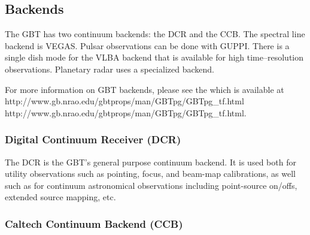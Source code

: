 

\subsection{Backends}\label{sec:backends}

The \gls{GBT} has two continuum backends: the \gls{DCR} and the \gls{CCB}.
The spectral line backend is \gls{VEGAS}.  Pulsar observations can be done
with \gls{GUPPI}.  There is a single dish mode for the \gls{VLBA} backend
that is available for high time--resolution observations.  Planetary radar
uses a specialized backend.

For more information on \gls{GBT} backends, please see the  which is available at \htmladdnormallink
{http://www.gb.nrao.edu/gbtprops/man/GBTpg/GBTpg\_tf.html}
{http://www.gb.nrao.edu/gbtprops/man/GBTpg/GBTpg_tf.html}.

\subsubsection{Digital Continuum Receiver (DCR)}

The \gls{DCR} is the \gls{GBT}'s general purpose continuum backend.
It is used both for utility observations such as pointing, focus,
and beam-map calibrations, as well such as for continuum astronomical
observations including point-source on/offs, extended source mapping, etc.


\subsubsection{Caltech Continuum Backend (CCB)}

